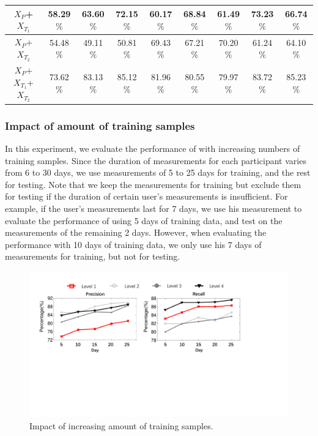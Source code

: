 \begin{table}[h]
\begin{tabular}{|c|c|c|c|c|c|c|c|c|}
$X_{P}$+$X_{T_1}$                   & 58.29$\%$               & 63.60$\%$                                 & 72.15$\%$                & 60.17$\%$            & 68.84$\%$               & 61.49$\%$                                 & 73.23$\%$               & 66.74$\%$\\ \hline

$X_{P}$+$X_{T_2}$                   & 54.48$\%$               & 49.11$\%$                                 & 50.81$\%$                & 69.43$\%$            & 67.21$\%$               & 70.20$\%$                                 & 61.24$\%$               & 64.10$\%$\\ \hline


$X_{P}$+$X_{T_1}$+$X_{T_2}$ & 73.62$\%$   & 83.13$\%$                                 & 85.12$\%$               & 81.96$\%$            & 80.55$\%$   & 79.97$\%$
  & 83.72$\%$               & 85.23$\%$                                  \\ \hline
  \end{tabular}
\end{table}


\subsubsection{Impact of amount of training samples}
In this experiment, we evaluate the performance of \sysname with increasing numbers of training samples.
Since the duration of measurements for each participant varies from 6 to 30 days, we use measurements of 5 to 25 days for training, and the rest for testing.
Note that we keep the measurements for training but exclude them for testing if the duration of certain user's measurements is insufficient.
For example, if the user's measurements last for 7 days, we use his measurement to evaluate the performance of using 5 days of training data, and test on the measurements of the remaining 2 days.
However, when evaluating the performance with 10 days of training data, we only use his 7 days of measurements for training, but not for testing.

\begin{figure}[h]
  \centering
  \includegraphics[width=0.9\columnwidth]{./img/performance_under_days1.pdf}
  \caption{Impact of increasing amount of training samples.}
  \label{fig:per_under_train_days}
\end{figure}

